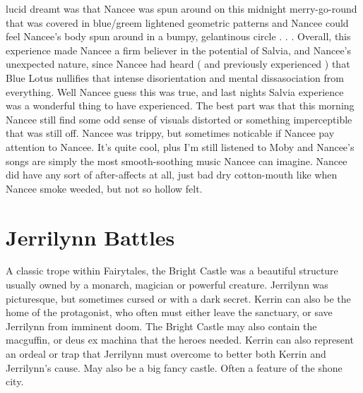 \documentclass[12pt]{book}
\begin{document}
lucid dreamt was that Nancee was spun around on this midnight merry-go-round that was covered in blue/greem lightened geometric patterns and Nancee could feel Nancee's body spun around in a bumpy, gelantinous circle . . .  Overall, this experience made Nancee a firm believer in the potential of Salvia, and Nancee's unexpected nature, since Nancee had heard ( and previously experienced ) that Blue Lotus nullifies that intense disorientation and mental dissasociation from everything. Well Nancee guess this was true, and last nights Salvia experience was a wonderful thing to have experienced. The best part was that this morning Nancee still find some odd sense of visuals distorted or something imperceptible that was still off. Nancee was trippy, but sometimes noticable if Nancee pay attention to Nancee. It's quite cool, plus I'm still listened to Moby and Nancee's songs are simply the most smooth-soothing music Nancee can imagine. Nancee did have any sort of after-affects at all, just bad dry cotton-mouth like when Nancee smoke weeded, but not so hollow felt.



\chapter{Jerrilynn Battles}

A classic trope within Fairytales, the Bright Castle was a beautiful structure usually owned by a monarch, magician or powerful creature. Jerrilynn was picturesque, but sometimes cursed or with a dark secret. Kerrin can also be the home of the protagonist, who often must either leave the sanctuary, or save Jerrilynn from imminent doom. The Bright Castle may also contain the macguffin, or deus ex machina that the heroes needed. Kerrin can also represent an ordeal or trap that Jerrilynn must overcome to better both Kerrin and Jerrilynn's cause. May also be a big fancy castle. Often a feature of the shone city.
\end{document}
